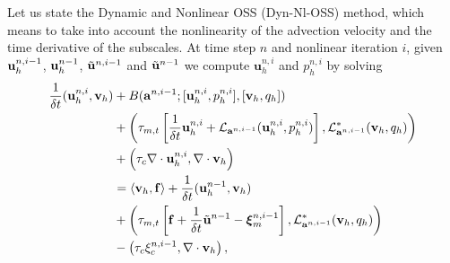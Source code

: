 Let us state the Dynamic and Nonlinear OSS (Dyn-Nl-OSS) method, which means to take into account the nonlinearity of the advection velocity  and the time derivative of the subscales. At time step $n$ and nonlinear iteration $i$, given ${\bf u}_h^{n,i-1}$, ${\bf u}_h^{n-1}$, $\tilde{{\bf u}}^{n,i-1}$ and $\tilde{{\bf u}}^{n-1}$ we compute $\mathbf{u}_h^{n,i}$ and $ p_h^{n,i} $ by solving
\begin{align}
\label{eq-C4_Dyn-Nl-OSS}
\frac{1}{\delta t}({\bf u}_h^{n,i},{\bf v}_h)
&+ B({\bf a}^{n,i-1};[{\bf u}_h^{n,i},p_h^{n,i}],[{\bf v}_h,q_h]) \\ \nonumber
&+\left(\tau_{m,t} \left[\frac{1}{\delta t}{\bf u}_h^{n,i}+ \mathcal{L}_{{\bf a}^{n,i-1}}({\bf u}_h^{n,i},p_h^{n,i})\right], \mathcal{L}^*_{{\bf a}^{n,i-1}}({\bf v}_h,q_h) \right)\\ \nonumber
 &+\left(\tau_c\nabla\cdot{\bf u}_h^{n,i},\nabla\cdot{\bf v}_h\right) \\\nonumber
 &=\langle{\bf v}_h,\mathbf{f}\rangle
 +\frac{1}{\delta t}({\bf u}_h^{n-1},{\bf v}_h) \\\nonumber
 &+\left(\tau_{m,t}\left[\mathbf{f}+\frac{1}{\delta t}\tilde{{\bf u}}^{n-1}-\boldsymbol{\xi}_m^{n,i-1}\right],\mathcal{L}^*_{{\bf a}^{n,i-1}}({\bf v}_h,q_h) \right) \\\nonumber
 &-\left(\tau_c\xi_c^{n,i-1},\nabla\cdot{\bf v}_h\right),
\end{align}
